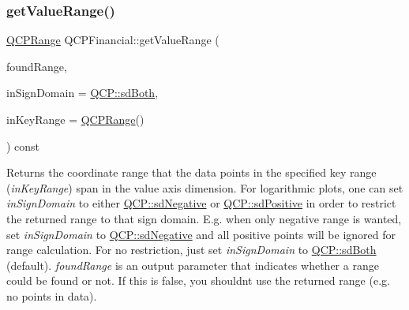 \mbox{\label{class_q_c_p_financial_a82d862aa134d78853f98f8c57a03415b}} 
\subsubsection{\texorpdfstring{get\+Value\+Range()}{getValueRange()}}
{\footnotesize\ttfamily \hyperlink{class_q_c_p_range}{Q\+C\+P\+Range} Q\+C\+P\+Financial\+::get\+Value\+Range (\begin{DoxyParamCaption}\item[{bool \&}]{found\+Range,  }\item[{\hyperlink{namespace_q_c_p_afd50e7cf431af385614987d8553ff8a9}{Q\+C\+P\+::\+Sign\+Domain}}]{in\+Sign\+Domain = {\ttfamily \hyperlink{namespace_q_c_p_afd50e7cf431af385614987d8553ff8a9aa38352ef02d51ddfa4399d9551566e24}{Q\+C\+P\+::sd\+Both}},  }\item[{const \hyperlink{class_q_c_p_range}{Q\+C\+P\+Range} \&}]{in\+Key\+Range = {\ttfamily \hyperlink{class_q_c_p_range}{Q\+C\+P\+Range}()} }\end{DoxyParamCaption}) const\hspace{0.3cm}{\ttfamily [virtual]}}

Returns the coordinate range that the data points in the specified key range ({\itshape in\+Key\+Range}) span in the value axis dimension. For logarithmic plots, one can set {\itshape in\+Sign\+Domain} to either \hyperlink{namespace_q_c_p_afd50e7cf431af385614987d8553ff8a9a2d18af0bc58f6528d1e82ce699fe4829}{Q\+C\+P\+::sd\+Negative} or \hyperlink{namespace_q_c_p_afd50e7cf431af385614987d8553ff8a9a584784b75fb816abcc627cf743bb699f}{Q\+C\+P\+::sd\+Positive} in order to restrict the returned range to that sign domain. E.\+g. when only negative range is wanted, set {\itshape in\+Sign\+Domain} to \hyperlink{namespace_q_c_p_afd50e7cf431af385614987d8553ff8a9a2d18af0bc58f6528d1e82ce699fe4829}{Q\+C\+P\+::sd\+Negative} and all positive points will be ignored for range calculation. For no restriction, just set {\itshape in\+Sign\+Domain} to \hyperlink{namespace_q_c_p_afd50e7cf431af385614987d8553ff8a9aa38352ef02d51ddfa4399d9551566e24}{Q\+C\+P\+::sd\+Both} (default). {\itshape found\+Range} is an output parameter that indicates whether a range could be found or not. If this is false, you shouldn\textquotesingle{}t use the returned range (e.\+g. no points in data).

